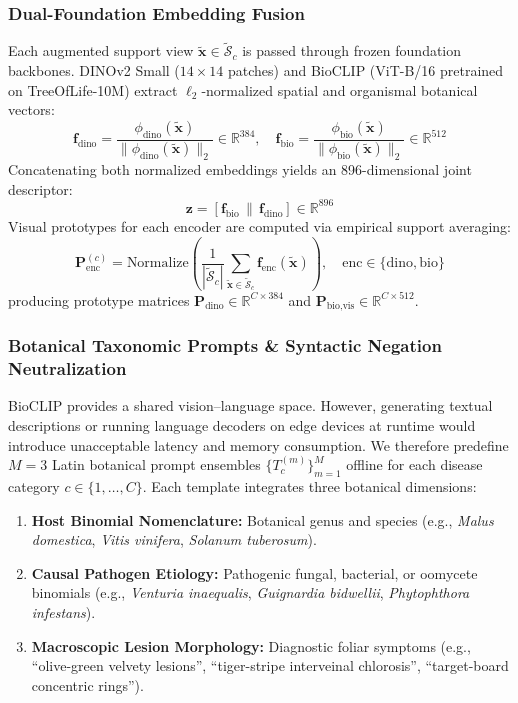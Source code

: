 \documentclass[a4paper,fleqn,nologo]{cas-dc}
\begin{document}
\subsubsection{Dual-Foundation Embedding Fusion}
Each augmented support view $\tilde{\mathbf{x}} \in \tilde{\mathcal{S}}_c$ is passed through frozen foundation backbones. DINOv2 Small ($14\times 14$ patches) \cite{oquab2023dinov2} and BioCLIP (ViT-B/16 pretrained on TreeOfLife-10M) \cite{stevens2024bioclip} extract $\ell_2$-normalized spatial and organismal botanical vectors:
\begin{equation}
    \mathbf{f}_{\text{dino}} = \frac{\phi_{\text{dino}}(\tilde{\mathbf{x}})}{\|\phi_{\text{dino}}(\tilde{\mathbf{x}})\|_2} \in \mathbb{R}^{384}, \quad
    \mathbf{f}_{\text{bio}} = \frac{\phi_{\text{bio}}(\tilde{\mathbf{x}})}{\|\phi_{\text{bio}}(\tilde{\mathbf{x}})\|_2} \in \mathbb{R}^{512}
\end{equation}
Concatenating both normalized embeddings yields an 896-dimensional joint descriptor:
\begin{equation}
    \mathbf{z} = [\mathbf{f}_{\text{bio}} \,\|\, \mathbf{f}_{\text{dino}}] \in \mathbb{R}^{896}
\end{equation}
Visual prototypes for each encoder are computed via empirical support averaging:
\begin{equation}
    \mathbf{P}_{\text{enc}}^{(c)} = \text{Normalize}\left(\frac{1}{|\tilde{\mathcal{S}}_c|}\sum_{\tilde{\mathbf{x}} \in \tilde{\mathcal{S}}_c} \mathbf{f}_{\text{enc}}(\tilde{\mathbf{x}})\right), \quad \text{enc} \in \{\text{dino}, \text{bio}\}
\end{equation}
producing prototype matrices $\mathbf{P}_{\text{dino}} \in \mathbb{R}^{C \times 384}$ and $\mathbf{P}_{\text{bio,vis}} \in \mathbb{R}^{C \times 512}$.

\subsubsection{Botanical Taxonomic Prompts \& Syntactic Negation Neutralization}
BioCLIP provides a shared vision--language space. However, generating textual descriptions or running language decoders on edge devices at runtime would introduce unacceptable latency and memory consumption. We therefore predefine $M=3$ Latin botanical prompt ensembles $\{T_c^{(m)}\}_{m=1}^M$ offline for each disease category $c \in \{1, \dots, C\}$. Each template integrates three botanical dimensions:
\begin{enumerate}
    \item \textbf{Host Binomial Nomenclature:} Botanical genus and species (e.g., \textit{Malus domestica}, \textit{Vitis vinifera}, \textit{Solanum tuberosum}).
    \item \textbf{Causal Pathogen Etiology:} Pathogenic fungal, bacterial, or oomycete binomials (e.g., \textit{Venturia inaequalis}, \textit{Guignardia bidwellii}, \textit{Phytophthora infestans}).
    \item \textbf{Macroscopic Lesion Morphology:} Diagnostic foliar symptoms (e.g., ``olive-green velvety lesions'', ``tiger-stripe interveinal chlorosis'', ``target-board concentric rings'').
\end{enumerate}
\end{document}
